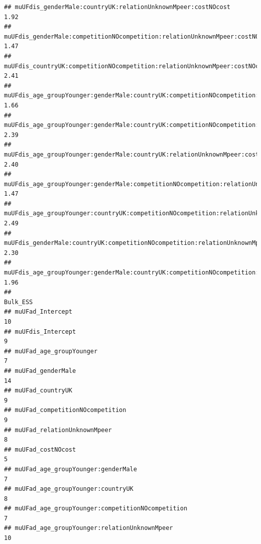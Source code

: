 \documentclass[
]{article}
\begin{document}
\begin{verbatim}
## muUFdis_genderMale:countryUK:relationUnknownMpeer:costNOcost                                           1.92
## muUFdis_genderMale:competitionNOcompetition:relationUnknownMpeer:costNOcost                            1.47
## muUFdis_countryUK:competitionNOcompetition:relationUnknownMpeer:costNOcost                             2.41
## muUFdis_age_groupYounger:genderMale:countryUK:competitionNOcompetition:relationUnknownMpeer            1.66
## muUFdis_age_groupYounger:genderMale:countryUK:competitionNOcompetition:costNOcost                      2.39
## muUFdis_age_groupYounger:genderMale:countryUK:relationUnknownMpeer:costNOcost                          2.40
## muUFdis_age_groupYounger:genderMale:competitionNOcompetition:relationUnknownMpeer:costNOcost           1.47
## muUFdis_age_groupYounger:countryUK:competitionNOcompetition:relationUnknownMpeer:costNOcost            2.49
## muUFdis_genderMale:countryUK:competitionNOcompetition:relationUnknownMpeer:costNOcost                  2.30
## muUFdis_age_groupYounger:genderMale:countryUK:competitionNOcompetition:relationUnknownMpeer:costNOcost 1.96
##                                                                                                        Bulk_ESS
## muUFad_Intercept                                                                                             10
## muUFdis_Intercept                                                                                             9
## muUFad_age_groupYounger                                                                                       7
## muUFad_genderMale                                                                                            14
## muUFad_countryUK                                                                                              9
## muUFad_competitionNOcompetition                                                                               9
## muUFad_relationUnknownMpeer                                                                                   8
## muUFad_costNOcost                                                                                             5
## muUFad_age_groupYounger:genderMale                                                                            7
## muUFad_age_groupYounger:countryUK                                                                             8
## muUFad_age_groupYounger:competitionNOcompetition                                                              7
## muUFad_age_groupYounger:relationUnknownMpeer                                                                 10

\end{verbatim}
\end{document}
